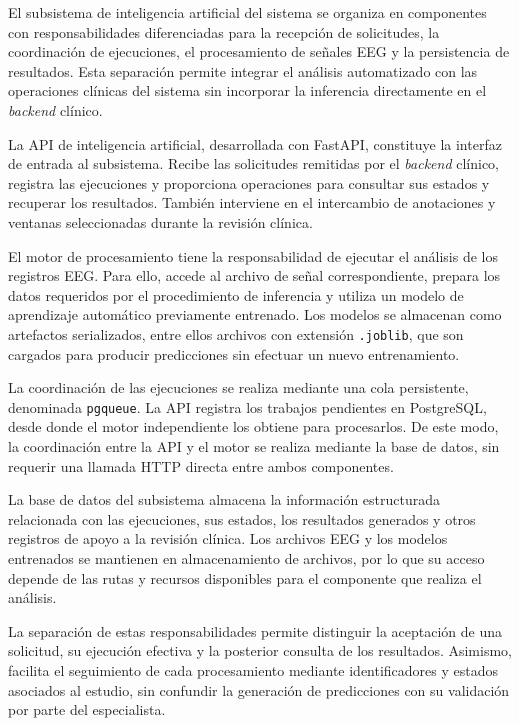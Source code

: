 El subsistema de inteligencia artificial del sistema se
organiza en componentes con responsabilidades diferenciadas
para la recepción de solicitudes, la coordinación de
ejecuciones, el procesamiento de señales EEG y la
persistencia de resultados. Esta separación permite
integrar el análisis automatizado con las operaciones
clínicas del sistema sin incorporar la inferencia
directamente en el \textit{backend} clínico.

La API de inteligencia artificial, desarrollada con
FastAPI, constituye la interfaz de entrada al subsistema.
Recibe las solicitudes remitidas por el \textit{backend} clínico,
registra las ejecuciones y proporciona operaciones para
consultar sus estados y recuperar los resultados. También
interviene en el intercambio de anotaciones y ventanas
seleccionadas durante la revisión clínica.

El motor de procesamiento tiene la responsabilidad de
ejecutar el análisis de los registros EEG. Para ello,
accede al archivo de señal correspondiente, prepara
los datos requeridos por el procedimiento de inferencia
y utiliza un modelo de aprendizaje automático previamente
entrenado. Los modelos se almacenan como artefactos
serializados, entre ellos archivos con extensión
\texttt{.joblib}, que son cargados para producir
predicciones sin efectuar un nuevo entrenamiento.

La coordinación de las ejecuciones se realiza mediante una cola persistente, denominada \texttt{pgqueue}.
La API registra los trabajos pendientes en PostgreSQL, desde donde el motor independiente los obtiene para procesarlos.
De este modo, la coordinación
entre la API y el motor se realiza mediante la base
de datos, sin requerir una llamada HTTP directa
entre ambos componentes.

La base de datos del subsistema almacena la información
estructurada relacionada con las ejecuciones, sus estados,
los resultados generados y otros registros de apoyo a
la revisión clínica. Los archivos EEG y los modelos
entrenados se mantienen en almacenamiento de archivos,
por lo que su acceso depende de las rutas y recursos
disponibles para el componente que realiza el análisis.

La separación de estas responsabilidades permite
distinguir la aceptación de una solicitud, su ejecución
efectiva y la posterior consulta de los resultados.
Asimismo, facilita el seguimiento de cada procesamiento
mediante identificadores y estados asociados al estudio,
sin confundir la generación de predicciones con su
validación por parte del especialista.


